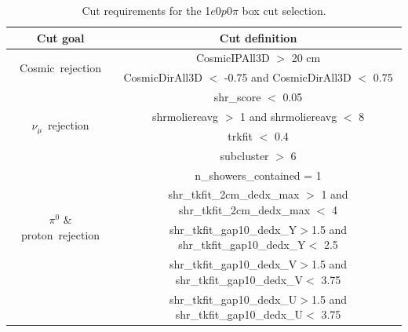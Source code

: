 \documentclass[a4paper]{article}
\newcommand{\zpsel}{1$e$0$p$0$\pi$\xspace}
\begin{document}
\begin{table}[h!]
\centering
\setlength{\tabcolsep}{10pt}
\renewcommand{\arraystretch}{1.25}
 \begin{tabular}{| c | c |} 
 \hline
 Cut goal & Cut definition \\
 \hline\hline
\multirow{2}{*}{Cosmic~rejection} & CosmicIPAll3D $>$ 20 \si{\cm} \\
& CosmicDirAll3D $<$ -0.75 and CosmicDirAll3D $<$ 0.75 \\
 \hline
\multirow{4}{*}{$\nu_\mu$~rejection} & shr\_score $<$ 0.05 \\ & shrmoliereavg $>$ 1 and shrmoliereavg $<$ 8\\ &trkfit $<$ 0.4 \\ & subcluster $>$ 6\\
 \hline
 \multirow{4}{*}{$\pi^0$ \& proton~rejection} & n\_showers\_contained = 1\\ & shr\_tkfit\_2cm\_dedx\_max $>$ 1 and shr\_tkfit\_2cm\_dedx\_max $<$ 4\\ & shr\_tkfit\_gap10\_dedx\_Y$>$1.5 and shr\_tkfit\_gap10\_dedx\_Y$<$ 2.5\\ &
 shr\_tkfit\_gap10\_dedx\_V$>$1.5 and shr\_tkfit\_gap10\_dedx\_V$<$ 3.75\\ &
 shr\_tkfit\_gap10\_dedx\_U$>$1.5 and shr\_tkfit\_gap10\_dedx\_U$<$ 3.75\\
 \hline
 \end{tabular}
 \caption{\label{tab:1e0p:cutbased} Cut requirements for the \zpsel box cut selection.}
\end{table}


\end{document}
